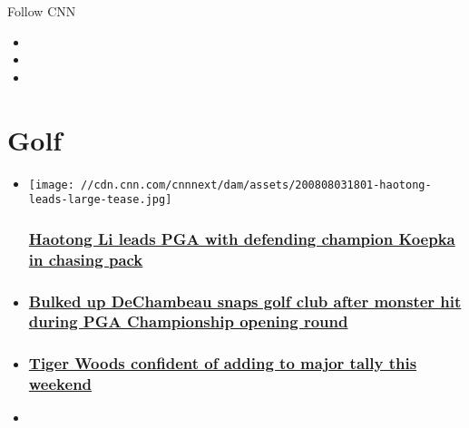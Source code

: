 Follow CNN

\begin{itemize}
\item
\item
\item
\end{itemize}

\hypertarget{golf}{%
\section{Golf}\label{golf}}

\begin{itemize}
\item
  \href{/2020/08/08/golf/golf-pga-haotong-trump-koepka-woods-spt-intl/index.html}{}

  \texttt{[image: //cdn.cnn.com/cnnnext/dam/assets/200808031801-haotong-leads-large-tease.jpg]}

  \hypertarget{haotong-li-leads-pga-with-defending-champion-koepka-in-chasing-pack}{%
  \subsubsection{\texorpdfstring{\href{/2020/08/08/golf/golf-pga-haotong-trump-koepka-woods-spt-intl/index.html}{Haotong
  Li leads PGA with defending champion Koepka in chasing
  pack}}{Haotong Li leads PGA with defending champion Koepka in chasing pack}}\label{haotong-li-leads-pga-with-defending-champion-koepka-in-chasing-pack}}
\item
  \hypertarget{bulked-up-dechambeau-snaps-golf-club-after-monster-hit-during-pga-championship-opening-round}{%
  \subsubsection{\texorpdfstring{\href{/2020/08/07/golf/pga-championship-first-round-recap-bryson-dechambeau-spt-intl/index.html}{Bulked
  up DeChambeau snaps golf club after monster hit during PGA
  Championship opening
  round}}{Bulked up DeChambeau snaps golf club after monster hit during PGA Championship opening round}}\label{bulked-up-dechambeau-snaps-golf-club-after-monster-hit-during-pga-championship-opening-round}}
\item
  \hypertarget{tiger-woods-confident-of-adding-to-major-tally-this-weekend}{%
  \subsubsection{\texorpdfstring{\href{/2020/08/05/golf/tiger-woods-pga-championship-golf-spt-intl/index.html}{Tiger
  Woods confident of adding to major tally this
  weekend}}{Tiger Woods confident of adding to major tally this weekend}}\label{tiger-woods-confident-of-adding-to-major-tally-this-weekend}}
\item
  \hypertarget{justin-thomas-returns-to-world-no-1-ahead-of-pga-championship-}{%
}
\end{itemize}

